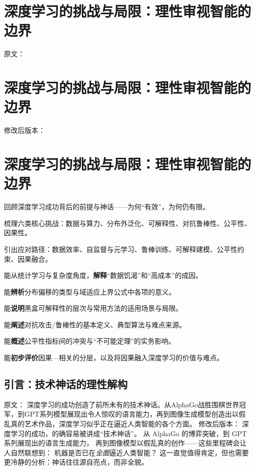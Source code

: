 \chapter{深度学习的挑战与局限：理性审视智能的边界}

原文：
\chapter{深度学习的挑战与局限：理性审视智能的边界}
修改后版本：
\chapter{深度学习的挑战与局限：理性审视智能的边界}

\begin{introduction}[本章提要]
  \item 回顾深度学习成功背后的前提与神话——为何“有效”，为何仍有限。
  \item 梳理六类核心挑战：数据与算力、分布外泛化、可解释性、对抗鲁棒性、公平性、因果性。
  \item 引出应对路径：数据效率、自监督与元学习、鲁棒训练、可解释建模、公平性约束、因果融合。
\end{introduction}

\begin{introduction}[你将收获]
  \item 能从统计学习与复杂度角度，\textbf{解释}“数据饥渴”和“高成本”的成因。
  \item 能\textbf{辨析}分布偏移的类型与域适应上界公式中各项的意义。
  \item 能\textbf{说明}黑盒可解释性的层次与常用方法的适用场景与局限。
  \item 能\textbf{阐述}对抗攻击/鲁棒性的基本定义、典型算法与难点来源。
  \item 能\textbf{概述}公平性指标间的冲突与“不可能定理”的实务影响。
  \item 能\textbf{初步评价}因果—相关的分层，以及将因果融入深度学习的价值与难点。
\end{introduction}


\section{引言：技术神话的理性解构}

原文：
深度学习的成功创造了前所未有的技术神话。从AlphaGo战胜围棋世界冠军，到GPT系列模型展现出令人惊叹的语言能力，再到图像生成模型创造出以假乱真的艺术作品，深度学习似乎正在逼近人类智能的各个方面。
修改后版本：
深度学习的成功，的确容易被讲成“技术神话”。  
从 AlphaGo 的博弈突破，到 GPT 系列展现出的语言生成能力，  
再到图像模型以假乱真的创作——这些里程碑会让人自然联想到：  
机器是否已在\textit{全面}逼近人类智能？  
这一直觉值得肯定，但也需要更冷静的分析：神话往往源自亮点，而非全貌。

